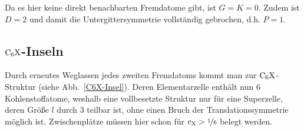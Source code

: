 \documentclass[a4paper, 10pt, twoside, openany]{book} %
\def \cX {c_\mathrm{X}}
\begin{document}
	Da es hier keine direkt benachbarten Fremdatome gibt, ist $G = K = 0$. Zudem ist $D = 2$ und damit die Untergittersymmetrie vollständig gebrochen, d.h. $P = 1$.
	
	\subsection{$\rm C_6X$-Inseln}
	
	Durch erneutes Weglassen jedes zweiten Fremdatoms kommt man zur $\rm C_6X$-Struktur (siehe Abb.~\ref{C6X-Insel}). Deren Elementarzelle enthält nun 6 Kohlenstoffatome, weshalb eine vollbesetzte Struktur nur für eine Superzelle, deren Größe $l$ durch 3 teilbar ist, ohne einen Bruch der Translationssymmetrie möglich ist. Zwischenplätze müssen hier schon für $\cX > \nicefrac 1 6$ belegt werden.
	
\end{document}
